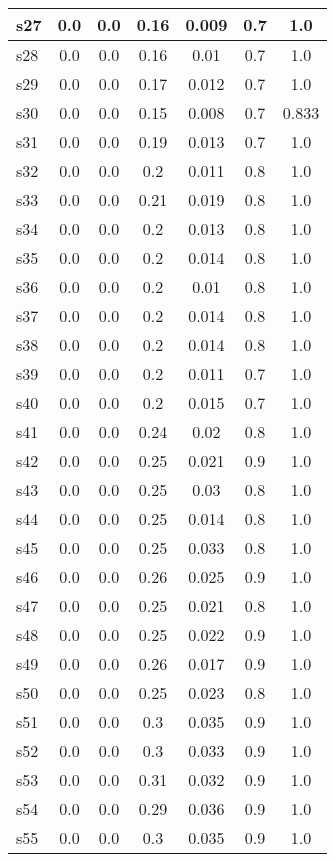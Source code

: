 \documentclass{article}
\begin{document}
\begin{tabular}{|l|c|c|c|c|c|c|}
\hline
s27 &0.0 & 0.0 & 0.16 & 0.009 & 0.7 & 1.0\\
\hline
s28 &0.0 & 0.0 & 0.16 & 0.01 & 0.7 & 1.0\\
\hline
s29 &0.0 & 0.0 & 0.17 & 0.012 & 0.7 & 1.0\\
\hline
s30 &0.0 & 0.0 & 0.15 & 0.008 & 0.7 & 0.833\\
\hline
s31 &0.0 & 0.0 & 0.19 & 0.013 & 0.7 & 1.0\\
\hline
s32 &0.0 & 0.0 & 0.2 & 0.011 & 0.8 & 1.0\\
\hline
s33 &0.0 & 0.0 & 0.21 & 0.019 & 0.8 & 1.0\\
\hline
s34 &0.0 & 0.0 & 0.2 & 0.013 & 0.8 & 1.0\\
\hline
s35 &0.0 & 0.0 & 0.2 & 0.014 & 0.8 & 1.0\\
\hline
s36 &0.0 & 0.0 & 0.2 & 0.01 & 0.8 & 1.0\\
\hline
s37 &0.0 & 0.0 & 0.2 & 0.014 & 0.8 & 1.0\\
\hline
s38 &0.0 & 0.0 & 0.2 & 0.014 & 0.8 & 1.0\\
\hline
s39 &0.0 & 0.0 & 0.2 & 0.011 & 0.7 & 1.0\\
\hline
s40 &0.0 & 0.0 & 0.2 & 0.015 & 0.7 & 1.0\\
\hline
s41 &0.0 & 0.0 & 0.24 & 0.02 & 0.8 & 1.0\\
\hline
s42 &0.0 & 0.0 & 0.25 & 0.021 & 0.9 & 1.0\\
\hline
s43 &0.0 & 0.0 & 0.25 & 0.03 & 0.8 & 1.0\\
\hline
s44 &0.0 & 0.0 & 0.25 & 0.014 & 0.8 & 1.0\\
\hline
s45 &0.0 & 0.0 & 0.25 & 0.033 & 0.8 & 1.0\\
\hline
s46 &0.0 & 0.0 & 0.26 & 0.025 & 0.9 & 1.0\\
\hline
s47 &0.0 & 0.0 & 0.25 & 0.021 & 0.8 & 1.0\\
\hline
s48 &0.0 & 0.0 & 0.25 & 0.022 & 0.9 & 1.0\\
\hline
s49 &0.0 & 0.0 & 0.26 & 0.017 & 0.9 & 1.0\\
\hline
s50 &0.0 & 0.0 & 0.25 & 0.023 & 0.8 & 1.0\\
\hline
s51 &0.0 & 0.0 & 0.3 & 0.035 & 0.9 & 1.0\\
\hline
s52 &0.0 & 0.0 & 0.3 & 0.033 & 0.9 & 1.0\\
\hline
s53 &0.0 & 0.0 & 0.31 & 0.032 & 0.9 & 1.0\\
\hline
s54 &0.0 & 0.0 & 0.29 & 0.036 & 0.9 & 1.0\\
\hline
s55 &0.0 & 0.0 & 0.3 & 0.035 & 0.9 & 1.0\\

\end{tabular}
\end{document}
